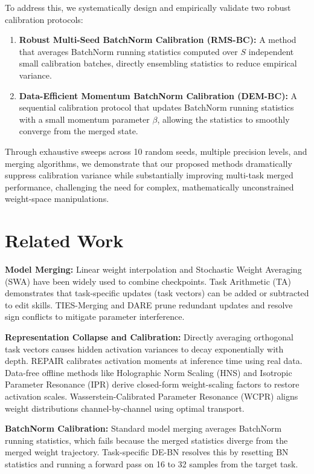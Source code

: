 \documentclass{article}
\begin{document}
To address this, we systematically design and empirically validate two robust calibration protocols:
\begin{enumerate}
    \item \textbf{Robust Multi-Seed BatchNorm Calibration (RMS-BC):} A method that averages BatchNorm running statistics computed over $S$ independent small calibration batches, directly ensembling statistics to reduce empirical variance.
    \item \textbf{Data-Efficient Momentum BatchNorm Calibration (DEM-BC):} A sequential calibration protocol that updates BatchNorm running statistics with a small momentum parameter $\beta$, allowing the statistics to smoothly converge from the merged state.
\end{enumerate}

Through exhaustive sweeps across 10 random seeds, multiple precision levels, and merging algorithms, we demonstrate that our proposed methods dramatically suppress calibration variance while substantially improving multi-task merged performance, challenging the need for complex, mathematically unconstrained weight-space manipulations.

\section{Related Work}
\label{submission-related}
\textbf{Model Merging:} Linear weight interpolation and Stochastic Weight Averaging (SWA) have been widely used to combine checkpoints. Task Arithmetic (TA) demonstrates that task-specific updates (task vectors) can be added or subtracted to edit skills. TIES-Merging and DARE prune redundant updates and resolve sign conflicts to mitigate parameter interference.

\textbf{Representation Collapse and Calibration:} Directly averaging orthogonal task vectors causes hidden activation variances to decay exponentially with depth. REPAIR calibrates activation moments at inference time using real data. Data-free offline methods like Holographic Norm Scaling (HNS) and Isotropic Parameter Resonance (IPR) derive closed-form weight-scaling factors to restore activation scales. Wasserstein-Calibrated Parameter Resonance (WCPR) aligns weight distributions channel-by-channel using optimal transport.

\textbf{BatchNorm Calibration:} Standard model merging averages BatchNorm running statistics, which fails because the merged statistics diverge from the merged weight trajectory. Task-specific DE-BN resolves this by resetting BN statistics and running a forward pass on 16 to 32 samples from the target task.
\end{document}

